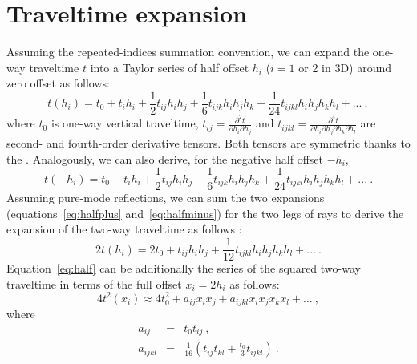 \section{Traveltime expansion}
Assuming the  repeated-indices summation convention, we can expand the one-way traveltime $t$ into a Taylor series of half offset $h_i$ ($i=1$ or 2 in 3D) around zero offset as follows:
\begin{equation}
\label{eq:halfplus}
t(h_i) = t_0 + t_i h_i + \frac{1}{2}t_{ij} h_i h_j + \frac{1}{6} t_{ijk} h_ih_jh_k+ \frac{1}{24}t_{ijkl}h_ih_jh_kh_l + ...~,
\end{equation}
where $t_0$ is one-way vertical traveltime, $t_{ij}=\frac{\partial^2 t}{\partial h_i \partial h_j}$ and $t_{ijkl}=\frac{\partial^4 t}{\partial h_i \partial h_j \partial h_k \partial h_l}$ are second- and fourth-order derivative tensors. Both tensors are symmetric thanks to the . Analogously, we can also derive, for the negative half offset $-h_i$,
\begin{equation}
\label{eq:halfminus}
t(-h_i) = t_0 - t_i h_i + \frac{1}{2}t_{ij} h_i h_j - \frac{1}{6} t_{ijk} h_ih_jh_k+ \frac{1}{24}t_{ijkl}h_ih_jh_kh_l + ...~.
\end{equation}
Assuming pure-mode reflections, we can sum the two expansions (equations~\ref{eq:halfplus} and~\ref{eq:halfminus}) for the two legs of rays to derive the expansion of the two-way traveltime as follows \cite[]{alhti}:
\begin{equation}
\label{eq:half}
2t(h_i) = 2t_0 + t_{ij} h_i h_j + \frac{1}{12}t_{ijkl}h_ih_jh_kh_l + ...~.
\end{equation}
Equation~\ref{eq:half} can be additionally  the series of the squared two-way traveltime in terms of the full offset $x_i = 2 h_i$ as follows:
\begin{equation}
\label{eq:full}
4t^2(x_i) \approx 4t_0^2 + a_{ij} x_i x_j + a_{ijkl} x_i x_j x_k x_l + ...~,
\end{equation}
where 
\begin{eqnarray}
\label{eq:a2}
a_{ij} & = & t_0 t_{ij}~,\\
\label{eq:a4}
a_{ijkl} & = & \frac{1}{16} \left( t_{ij} t_{kl} + \frac{t_0}{3}t_{ijkl} \right)~.
\end{eqnarray}

